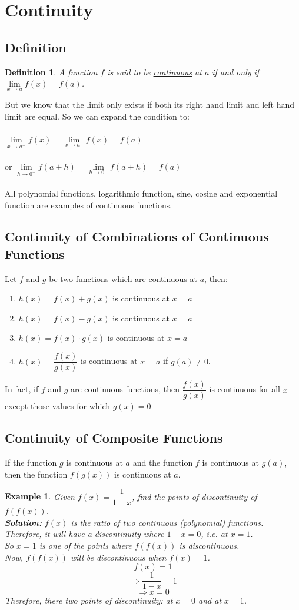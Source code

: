 \documentclass[14]{article}
\newtheorem{define}{Definition}
\newtheorem*{ex}{Example}
\theoremstyle{definition}
\theoremstyle{case}
\begin{document}
\section{Continuity}
\subsection{Definition}
\begin{define}
A function $f$ is said to be \underline{continuous} at $a$ if and only if $\lim\limits_{x \to a} f(x) = f(a)$.
\end{define}
But we know that the limit only exists if both its right hand limit and left hand limit are equal.
So we can expand the condition to:\\\\
$\lim\limits_{x \to a^+} f(x) = \lim\limits_{x \to a^-} f(x) = f(a)$\\\\
or $\lim\limits_{h \to 0^+} f(a+h) = \lim\limits_{h \to 0^-} f(a+h) = f(a)$\\\\
All polynomial functions, logarithmic function, sine, cosine and exponential function are examples of continuous functions.
\subsection{Continuity of Combinations of Continuous Functions}
Let $f$ and $g$ be two functions which are continuous at $a$, then:
\begin{enumerate}
\item $h(x) = f(x) + g(x)$ is continuous at 
$x = a$
\item $h(x) = f(x) - g(x)$ is continuous at $x = a$
\item $h(x) = f(x)\cdot g(x)$ is continuous at $x = a$
\item $h(x) = \dfrac{f(x)}{g(x)}$ is continuous at $x = a$ if $g(a) \neq 0$.
\end{enumerate}
In fact, if $f$ and $g$ are continuous functions, then $\dfrac{f(x)}{g(x)}$ is continuous for all $x$ except those values for which $g(x)=0$
\subsection{Continuity of Composite Functions}
If the function $g$ is continuous at $a$ and the function $f$ is continuous at $g(a)$, then the function $f(g(x))$ is continuous at $a$.
\begin{ex}
Given $f(x) = \dfrac{1}{1-x}$, find the points of discontinuity of $f(f(x))$.\\
\textbf{Solution: }$f(x)$ is the ratio of two continuous (polynomial) functions. Therefore, it will have a discontinuity where $1 - x = 0$, i.e. at $x = 1$.\\
So $x = 1$ is one of the points where $f(f(x))$ is discontinuous.\\
Now, $f(f(x))$ will be discontinuous when $f(x) = 1$.\\
\[f(x) = 1\]
\[\Rightarrow \dfrac{1}{1-x}=1\]
\[\Rightarrow x = 0\]
Therefore, there two points of discontinuity: at $x = 0$ and at $x = 1$.
\end{ex}
\pagebreak
\end{document}
